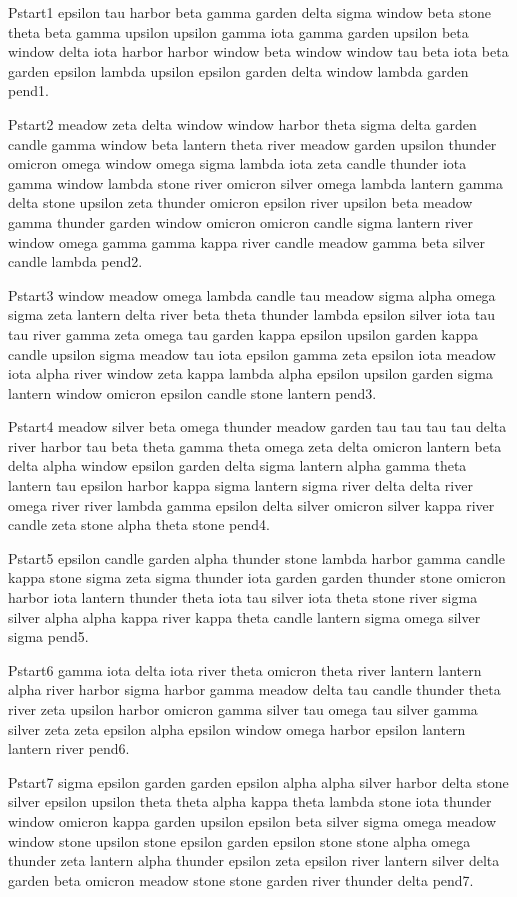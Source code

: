 \documentclass{article}
\begin{document}
Pstart1 epsilon tau harbor beta gamma garden delta sigma window beta stone theta beta gamma upsilon upsilon gamma iota gamma garden upsilon beta window delta iota harbor harbor window beta window window tau beta iota beta garden epsilon lambda upsilon epsilon garden delta window lambda garden pend1.

Pstart2 meadow zeta delta window window harbor theta sigma delta garden candle gamma window beta lantern theta river meadow garden upsilon thunder omicron omega window omega sigma lambda iota zeta candle thunder iota gamma window lambda stone river omicron silver omega lambda lantern gamma delta stone upsilon zeta thunder omicron epsilon river upsilon beta meadow gamma thunder garden window omicron omicron candle sigma lantern river window omega gamma gamma kappa river candle meadow gamma beta silver candle lambda pend2.

Pstart3 window meadow omega lambda candle tau meadow sigma alpha omega sigma zeta lantern delta river beta theta thunder lambda epsilon silver iota tau tau river gamma zeta omega tau garden kappa epsilon upsilon garden kappa candle upsilon sigma meadow tau iota epsilon gamma zeta epsilon iota meadow iota alpha river window zeta kappa lambda alpha epsilon upsilon garden sigma lantern window omicron epsilon candle stone lantern pend3.

Pstart4 meadow silver beta omega thunder meadow garden tau tau tau tau delta river harbor tau beta theta gamma theta omega zeta delta omicron lantern beta delta alpha window epsilon garden delta sigma lantern alpha gamma theta lantern tau epsilon harbor kappa sigma lantern sigma river delta delta river omega river river lambda gamma epsilon delta silver omicron silver kappa river candle zeta stone alpha theta stone pend4.

Pstart5 epsilon candle garden alpha thunder stone lambda harbor gamma candle kappa stone sigma zeta sigma thunder iota garden garden thunder stone omicron harbor iota lantern thunder theta iota tau silver iota theta stone river sigma silver alpha alpha kappa river kappa theta candle lantern sigma omega silver sigma pend5.

Pstart6 gamma iota delta iota river theta omicron theta river lantern lantern alpha river harbor sigma harbor gamma meadow delta tau candle thunder theta river zeta upsilon harbor omicron gamma silver tau omega tau silver gamma silver zeta zeta epsilon alpha epsilon window omega harbor epsilon lantern lantern river pend6.

Pstart7 sigma epsilon garden garden epsilon alpha alpha silver harbor delta stone silver epsilon upsilon theta theta alpha kappa theta lambda stone iota thunder window omicron kappa garden upsilon epsilon beta silver sigma omega meadow window stone upsilon stone epsilon garden epsilon stone stone alpha omega thunder zeta lantern alpha thunder epsilon zeta epsilon river lantern silver delta garden beta omicron meadow stone stone garden river thunder delta pend7.
\end{document}
